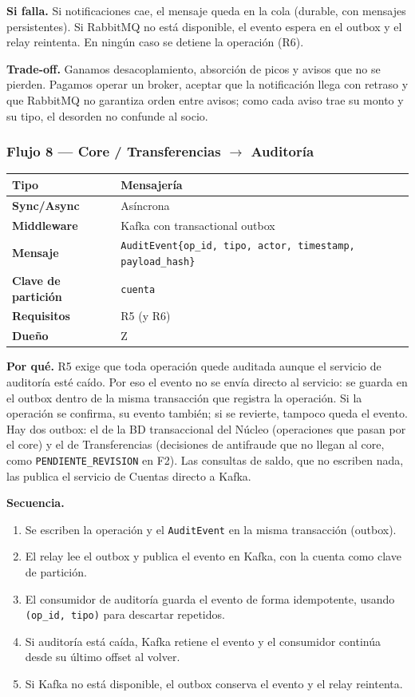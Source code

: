 \documentclass[11pt,a4paper]{article}
\begin{document}
\textbf{Si falla.} Si notificaciones cae, el mensaje queda en la cola (durable,
con mensajes persistentes). Si RabbitMQ no está disponible, el evento espera en
el outbox y el relay reintenta. En ningún caso se detiene la operación (R6).

\textbf{Trade-off.} Ganamos desacoplamiento, absorción de picos y avisos que no
se pierden. Pagamos operar un broker, aceptar que la notificación llega con
retraso y que RabbitMQ no garantiza orden entre avisos; como cada aviso trae su
monto y su tipo, el desorden no confunde al socio.

\subsubsection*{Flujo 8 --- Core / Transferencias $\rightarrow$ Auditoría}

\begin{tabular}{|l|p{9.5cm}|}
\hline
\textbf{Tipo} & Mensajería \\ \hline
\textbf{Sync/Async} & Asíncrona \\ \hline
\textbf{Middleware} & Kafka con transactional outbox \\ \hline
\textbf{Mensaje} & \texttt{AuditEvent\{op\_id, tipo, actor, timestamp, payload\_hash\}} \\ \hline
\textbf{Clave de partición} & \texttt{cuenta} \\ \hline
\textbf{Requisitos} & R5 (y R6) \\ \hline
\textbf{Dueño} & Z \\ \hline
\end{tabular}

\medskip
\textbf{Por qué.} R5 exige que toda operación quede auditada aunque el servicio
de auditoría esté caído. Por eso el evento no se envía directo al servicio: se
guarda en el outbox dentro de la misma transacción que registra la operación.
Si la operación se confirma, su evento también; si se revierte, tampoco queda
el evento. Hay dos outbox: el de la BD transaccional del Núcleo (operaciones
que pasan por el core) y el de Transferencias (decisiones de antifraude que no
llegan al core, como \texttt{PENDIENTE\_REVISION} en F2). Las consultas de
saldo, que no escriben nada, las publica el servicio de Cuentas directo a
Kafka.

\textbf{Secuencia.}
\begin{enumerate}
  \item Se escriben la operación y el \texttt{AuditEvent} en la misma
        transacción (outbox).
  \item El relay lee el outbox y publica el evento en Kafka, con la cuenta
        como clave de partición.
  \item El consumidor de auditoría guarda el evento de forma idempotente,
        usando \texttt{(op\_id, tipo)} para descartar repetidos.
  \item Si auditoría está caída, Kafka retiene el evento y el consumidor
        continúa desde su último offset al volver.
  \item Si Kafka no está disponible, el outbox conserva el evento y el relay
        reintenta.
\end{enumerate}
\end{document}
